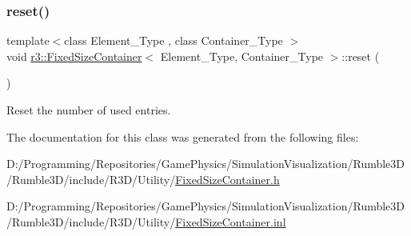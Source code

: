 \subsubsection{\texorpdfstring{reset()}{reset()}}
{\footnotesize\ttfamily template$<$class Element\+\_\+\+Type , class Container\+\_\+\+Type $>$ \\
void \mbox{\hyperlink{classr3_1_1_fixed_size_container}{r3\+::\+Fixed\+Size\+Container}}$<$ Element\+\_\+\+Type, Container\+\_\+\+Type $>$\+::reset (\begin{DoxyParamCaption}{ }\end{DoxyParamCaption})}



Reset the number of used entries. 



The documentation for this class was generated from the following files\+:\begin{DoxyCompactItemize}
\item 
D\+:/\+Programming/\+Repositories/\+Game\+Physics/\+Simulation\+Visualization/\+Rumble3\+D/\+Rumble3\+D/include/\+R3\+D/\+Utility/\mbox{\hyperlink{_fixed_size_container_8h}{Fixed\+Size\+Container.\+h}}\item 
D\+:/\+Programming/\+Repositories/\+Game\+Physics/\+Simulation\+Visualization/\+Rumble3\+D/\+Rumble3\+D/include/\+R3\+D/\+Utility/\mbox{\hyperlink{_fixed_size_container_8inl}{Fixed\+Size\+Container.\+inl}}\end{DoxyCompactItemize}

